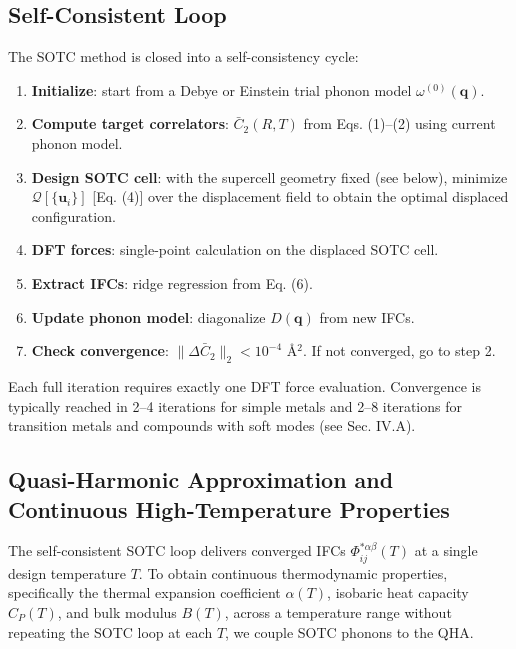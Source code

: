 \documentclass[aps,prb,reprint,amsmath,amssymb,floatfix]{revtex4-2}
\providecommand{\tightlist}{\setlength{\itemsep}{0pt}\setlength{\parskip}{0pt}}
\begin{document}
\subsection{Self-Consistent Loop}\label{self-consistent-loop}

The SOTC method is closed into a self-consistency cycle:

\begin{enumerate}
\def\labelenumi{\arabic{enumi}.}
\tightlist
\item
  \textbf{Initialize}: start from a Debye or Einstein trial phonon model
  \(\omega^{(0)}(\mathbf{q})\).
\item
  \textbf{Compute target correlators}: \(\bar{C}_2(R,T)\) from Eqs.
  (1)--(2) using current phonon model.
\item
  \textbf{Design SOTC cell}: with the supercell geometry fixed (see
  below), minimize \(\mathcal{Q}[\{\mathbf{u}_i\}]\) [Eq. (4)] over
  the displacement field to obtain the optimal displaced configuration.
\item
  \textbf{DFT forces}: single-point calculation on the displaced SOTC
  cell.
\item
  \textbf{Extract IFCs}: ridge regression from Eq. (6).
\item
  \textbf{Update phonon model}: diagonalize \(D(\mathbf{q})\) from new
  IFCs.
\item
  \textbf{Check convergence}: \(\|\Delta\bar{C}_2\|_2 < 10^{-4}\)
  Å\(^2\). If not converged, go to step 2.
\end{enumerate}

Each full iteration requires exactly one DFT force evaluation.
Convergence is typically reached in 2--4 iterations for simple metals
and 2--8 iterations for transition metals and compounds with soft modes
(see Sec. IV.A).

\subsection{Quasi-Harmonic Approximation and Continuous High-Temperature
Properties}\label{quasi-harmonic-approximation-and-continuous-high-temperature-properties}

The self-consistent SOTC loop delivers converged IFCs
\(\Phi_{ij}^{*\alpha\beta}(T)\) at a single design temperature \(T\). To
obtain continuous thermodynamic properties, specifically the thermal
expansion coefficient \(\alpha(T)\), isobaric heat capacity \(C_P(T)\),
and bulk modulus \(B(T)\), across a temperature range without repeating
the SOTC loop at each \(T\), we couple SOTC phonons to the QHA.
\end{document}
